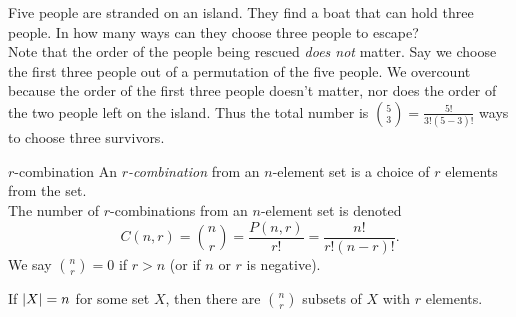 \documentclass[class=article, crop=false]{standalone}
\begin{document}
  \begin{example}{}
    Five people are stranded on an island. They find a boat that can hold three people. In how many ways can they choose three people to escape? \\[10pt]
    Note that the order of the people being rescued \emph{does not} matter. Say we choose the first three people out of a permutation of the five people. We overcount because the order of the first three people doesn't matter, nor does the order of the two people left on the island. Thus the total number is $\binom{5}{3} = \frac{5!}{3!(5-3)!}$ ways to choose three survivors.
  \end{example}
  \begin{definition}{$r$-combination}
    An \emph{$r$-combination} from an $n$-element set is a choice of $r$ elements from the set. \\
    The number of $r$-combinations from an $n$-element set is denoted
    \[
      C(n, r) = \binom{n}{r} = \frac{P(n,r)}{r!} = \frac{n!}{r!(n-r)!}.
    \]
    We say $\binom{n}{r} = 0$ if $r > n$ (or if $n$ or $r$ is negative).
  \end{definition}
  \begin{note}{}
    If $\left\lvert X \right\rvert = n$ for some set $X$, then there are $\binom{n}{r}$ subsets of $X$ with $r$ elements.
  \end{note}
\end{document}
